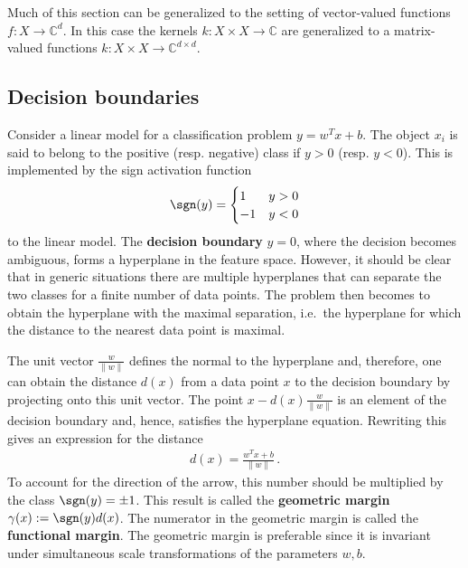     \begin{remark}
        Much of this section can be generalized to the setting of vector-valued functions $f:X\rightarrow\mathbb{C}^d$. In this case the kernels $k:X\times X\rightarrow\mathbb{C}$ are generalized to a matrix-valued functions $k:X\times X\rightarrow\mathbb{C}^{d\times d}$.
    \end{remark}

\subsection{Decision boundaries}

    Consider a linear model for a classification problem $y = w^Tx + b$. The object $x_i$ is said to belong to the positive (resp. negative) class if $y>0$ (resp. $y<0$). This is implemented by the sign activation function
    \begin{gather}
        \sgn(y) =
        \begin{cases}
            1&y>0\\
            -1&y<0
        \end{cases}
    \end{gather}
    to the linear model. The \textbf{decision boundary} $y=0$, where the decision becomes ambiguous, forms a hyperplane in the feature space. However, it should be clear that in generic situations there are multiple hyperplanes that can separate the two classes for a finite number of data points. The problem then becomes to obtain the hyperplane with the maximal separation, i.e.~the hyperplane for which the distance to the nearest data point is maximal.

    The unit vector $\frac{w}{\|w\|}$ defines the normal to the hyperplane and, therefore, one can obtain the distance $d(x)$ from a data point $x$ to the decision boundary by projecting onto this unit vector. The point $x - d(x)\frac{w}{\|w\|}$ is an element of the decision boundary and, hence, satisfies the hyperplane equation. Rewriting this gives an expression for the distance
    \begin{gather}
        d(x) = \frac{w^Tx + b}{\|w\|}\,.
    \end{gather}
    To account for the direction of the arrow, this number should be multiplied by the class $\sgn(y)=\pm1$. This result is called the \textbf{geometric margin} $\gamma(x):=\sgn(y)d(x)$. The numerator in the geometric margin is called the \textbf{functional margin}. The geometric margin is preferable since it is invariant under simultaneous scale transformations of the parameters $w,b$.

